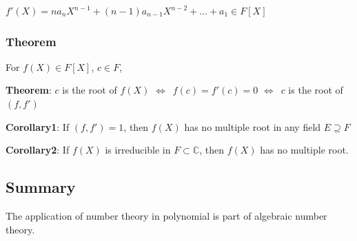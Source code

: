 \documentclass{article}
\begin{document}
\noindent
\begin{center}
$f'(X) = na_n X^{n-1} + (n-1)a_{n-1} X^{n-2} +...+ a_1 \in F[X]$
\end{center}

\subsubsection{Theorem}
For $f(X)\in F[X]$, $c \in F$,

\vspace{0.1cm}
\noindent
\textbf{Theorem}: $c$ is the root of $f(X)$ $\Leftrightarrow$\ $f(c) = f'(c) = 0$
$\Leftrightarrow$\ $c$ is the root of $(f, f')$

\vspace{0.1cm}
\noindent
\textbf{Corollary1}: If $(f,f')=1$, then $f(X)$ has no multiple root in any field $E \supseteq F$

\vspace{0.1cm}
\noindent
\textbf{Corollary2}: If $f(X)$ is irreducible in $F \subset \mathbb{C}$, then $f(X)$ has no multiple root.

\subsection{Summary}
The application of number theory in polynomial is part of algebraic number theory.
\end{document}
